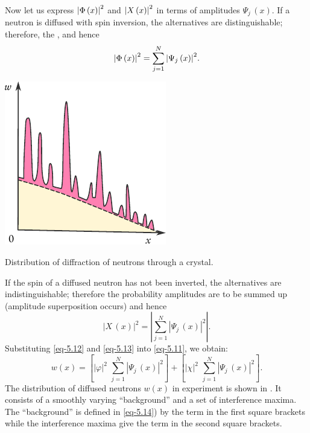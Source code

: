 Now let us express $ \abs{\Phi \, (x) }^{2}$ and $ \abs{X \, (x) }^{2}$ in terms of amplitudes  $\Psi_{j} \, (x)$. If a neutron is diffused with spin inversion, the alternatives are distinguishable; therefore, the , and hence
\begin{equation}%
\abs{\Phi \, (x) }^{2} = \sum_{j=1}^{N} \abs{\Psi_{j} \, (x) }^{2}.
\label{eq-5.12}
\end{equation}
\begin{marginfigure}%
\centering
\includegraphics[width=\textwidth]{figures/neutron-dist.pdf}
\caption{Distribution of diffraction of neutrons through a crystal.
\label{neutron-dist}}
\end{marginfigure}
If the spin of a diffused neutron has not been inverted, the alternatives
are indistinguishable; therefore the probability amplitudes are to be
summed up (amplitude superposition occurs) and hence
\begin{equation}%
|X \, (x) |^{2} = \left| \sum_{j=1}^{N} |\Psi_{j} \, (x) |^{2} \right|.
\label{eq-5.13}
\end{equation}
Substituting \eqref{eq-5.12} and \eqref{eq-5.13} into \eqref{eq-5.11}, we obtain:
\begin{equation}%
w(x) = \left[  |\varphi |^{2} \,\,  \sum_{j=1}^{N} |\Psi_{j} \, (x) |^{2} \right] + \left[  |\chi |^{2} \,\,  \sum_{j=1}^{N} |\Psi_{j} \, (x) |^{2} \right] . 
\label{eq-5.14}
\end{equation}
The distribution of diffused neutrons $w(x)$ in experiment is shown in
. It consists of a smoothly varying ``background'' and a set of interference maxima. The ``background'' is defined in \eqref{eq-5.14}) by the term in the first square brackets while the interference maxima give the term in the second square brackets.

